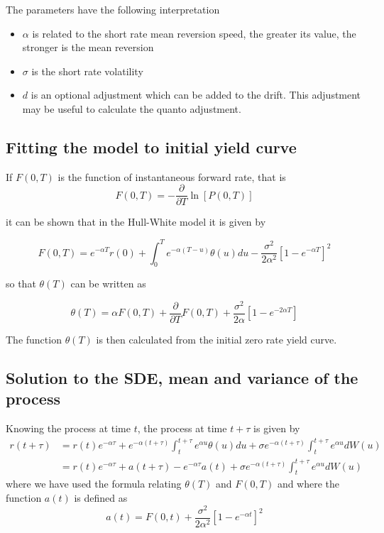 The parameters have the following interpretation
\begin{itemize}
\item $\alpha$ is related to the short rate mean reversion speed, the greater its value, the stronger is the mean reversion
\item $\sigma$ is the short rate volatility
\item $d$ is an optional adjustment which can be added to the drift. This adjustment may be useful
to calculate the quanto adjustment.
\end{itemize}

\subsection{Fitting the model to initial yield curve}

If $F(0,T)$ is the function of instantaneous forward rate, that is
\begin{equation}
F(0,T) = -\displaystyle \frac{\partial}{\partial T}\ln[P(0,T)]
\end{equation}

it can be shown that in the Hull-White model it is given by

\begin{equation}
F(0,T) = e^{-\alpha T}r(0) + \int_0^T e^{-\alpha (T-u)}\theta(u)du - \frac{\sigma^2}{2\alpha^2}\left[1-e^{-\alpha T}\right]^2
\end{equation}

so that $\theta(T)$ can be written as

\begin{equation}
\theta(T) = \alpha F(0,T)+\frac{\partial}{\partial T}F(0,T)+\frac{\sigma^2}{2\alpha}\left[1-e^{-2\alpha T}\right]
\end{equation}

The function $\theta(T)$ is then calculated from the initial zero rate yield curve.

\subsection{Solution to the SDE, mean and variance of the process}

Knowing the process at time $t$, the process at time $t+\tau$ is given by
\begin{align}
r(t+\tau) & = r(t) e^{-\alpha \tau} + e^{-\alpha (t+\tau)}\int_t^{t+\tau}\!\!\!\!e^{\alpha u}\theta(u)du + \sigma e^{-\alpha (t+\tau)}\int_t^{t+\tau}\!\!\!\!e^{\alpha u}dW(u)\\
 & = r(t) e^{-\alpha \tau} + a(t+\tau) - e^{-\alpha \tau} a(t) + \sigma e^{-\alpha (t+\tau)}\int_t^{t+\tau}\!\!\!\!e^{\alpha u}dW(u) \label{eq:HWevol}
\end{align}
where we have used the formula relating $\theta(T)$ and $F(0,T)$ and where the function $a(t)$ is defined as
\begin{equation}
a(t) = F(0,t) + \frac{\sigma^2}{2\alpha^2}\left[1-e^{-\alpha t}\right]^2
\end{equation}

